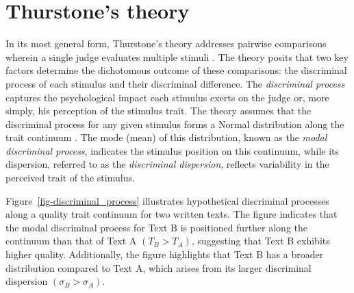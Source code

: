 \documentclass[
  authoryear,
  review,
  1p]{elsarticle}
\begin{document}
\section{Thurstone's theory}\label{sec-thurstone_theory}

In its most general form, Thurstone's theory addresses pairwise
comparisons wherein a single judge evaluates multiple stimuli
\citep[pp.~267]{Thurstone_1927b}. The theory posits that two key factors
determine the dichotomous outcome of these comparisons: the discriminal
process of each stimulus and their discriminal difference. The
\emph{discriminal process} captures the psychological impact each
stimulus exerts on the judge or, more simply, his perception of the
stimulus trait. The theory assumes that the discriminal process for any
given stimulus forms a Normal distribution along the trait continuum
\citep[pp.~266]{Thurstone_1927b}. The mode (mean) of this distribution,
known as the \emph{modal discriminal process}, indicates the stimulus
position on this continuum, while its dispersion, referred to as the
\emph{discriminal dispersion}, reflects variability in the perceived
trait of the stimulus.

Figure~\ref{fig-discriminal_process} illustrates hypothetical
discriminal processes along a quality trait continuum for two written
texts. The figure indicates that the modal discriminal process for Text
B is positioned further along the continuum than that of Text A
\((T_{B} > T_{A})\), suggesting that Text B exhibits higher quality.
Additionally, the figure highlights that Text B has a broader
distribution compared to Text A, which arises from its larger
discriminal dispersion \((\sigma_{B} > \sigma_{A})\).
\end{document}
